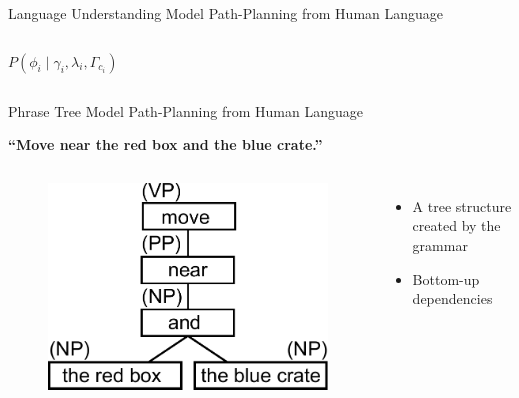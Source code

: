 \begin{frame}{Language Understanding}{ Model Path-Planning from Human Language }
\begin{columns}
	\begin{block}{}
		\centering
	$ P( \phi_i \mid \gamma_i , \lambda_i, \Gamma_{c_i} ) 	$
 	\end{block}
 	
\end{columns}


\end{frame}

\begin{frame}{Phrase Tree}{ Model Path-Planning from Human Language }

{\bf ``Move near the red box and the blue crate.''}

\begin{columns}
\begin{figure}
	\centering
	\includegraphics[width=.8\linewidth]{figure/phrase_structure2}
\end{figure}
\begin{itemize}
\item A tree structure created by the grammar
\item Bottom-up dependencies
\end{itemize}
\end{columns}

\end{frame}



